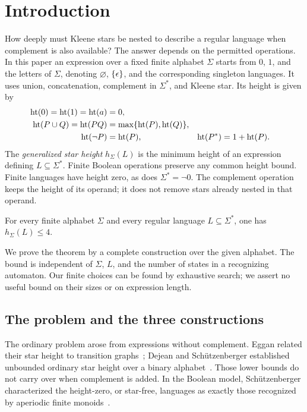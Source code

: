 \section{Introduction}\label{sec:introduction}

How deeply must Kleene stars be nested to describe a regular language when
complement is also available? The answer depends on the permitted
operations. In this paper an expression over a fixed finite alphabet
$\Sigma$ starts from $0$, $1$, and the letters of $\Sigma$, denoting
$\varnothing$, $\{\epsilon\}$, and the corresponding singleton languages.
It uses union, concatenation, complement in $\Sigma^*$, and Kleene star.
Its height is given by
\[
\begin{aligned}
 \operatorname{ht}(0)=\operatorname{ht}(1)=\operatorname{ht}(a)&=0,\\
 \operatorname{ht}(P\cup Q)=\operatorname{ht}(PQ)&=\max\{\operatorname{ht}(P),\operatorname{ht}(Q)\},\\
 \operatorname{ht}(\neg P)&=\operatorname{ht}(P),&
 \operatorname{ht}(P^*)&=1+\operatorname{ht}(P).
\end{aligned}
\]
The \emph{generalized star height} $h_\Sigma(L)$ is the minimum height of
an expression defining $L\subseteq\Sigma^*$. Finite Boolean operations
preserve any common height bound. Finite languages have height zero, as
does $\Sigma^*=\neg0$. The complement operation keeps the height of its
operand; it does not remove stars already nested in that operand.

\begin{theorem}\label{thm:main}
For every finite alphabet $\Sigma$ and every regular language
$L\subseteq\Sigma^*$, one has $h_\Sigma(L)\le4$.
\end{theorem}

We prove the theorem by a complete construction over the given alphabet.
The bound is independent of $\Sigma$, $L$, and the number of states in a
recognizing automaton. Our finite choices can be found by exhaustive
search; we assert no useful bound on their sizes or on expression length.

\subsection{The problem and the three constructions}

The ordinary problem arose from expressions without complement. Eggan
related their star height to transition graphs~\cite{Eggan1963};
Dejean and Sch\"utzenberger established unbounded ordinary star height over
a binary alphabet~\cite{DejeanSchutzenberger1966}. Those lower bounds do
not carry over when complement is added. In the Boolean model,
Sch\"utzenberger characterized the height-zero, or star-free, languages
as exactly those recognized by aperiodic finite
monoids~\cite{Schutzenberger1965}.

